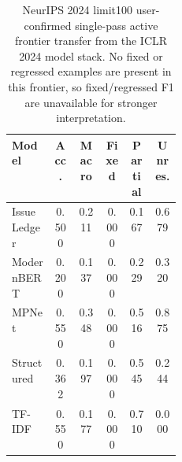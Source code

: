 \begin{table}[t]
\centering
\scriptsize
\setlength{\tabcolsep}{2pt}
\begin{tabular}{p{0.25\linewidth}ccccc}
\toprule
Model & Acc. & Macro & Fixed & Partial & Unres. \\
\midrule
Issue Ledger & 0.500 & 0.211 & 0.000 & 0.167 & 0.679 \\
ModernBERT & 0.200 & 0.137 & 0.000 & 0.229 & 0.320 \\
MPNet & 0.550 & 0.348 & 0.000 & 0.516 & 0.875 \\
Structured & 0.362 & 0.197 & 0.000 & 0.545 & 0.244 \\
TF-IDF & 0.550 & 0.177 & 0.000 & 0.710 & 0.000 \\
\bottomrule
\end{tabular}
\caption{NeurIPS 2024 limit100 user-confirmed single-pass active frontier transfer from the ICLR 2024 model stack. No fixed or regressed examples are present in this frontier, so fixed/regressed F1 are unavailable for stronger interpretation.}
\label{tab:neurips100-transfer}
\end{table}
